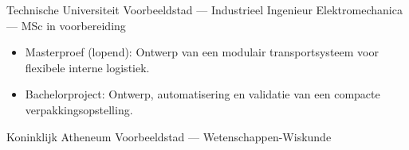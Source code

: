 
\begin{opleiding}
    {Technische Universiteit Voorbeeldstad --- Industrieel Ingenieur Elektromechanica --- MSc in voorbereiding
        \begin{itemize}
            \item Masterproef (lopend): Ontwerp van een modulair transportsysteem voor flexibele interne logistiek.
            \item Bachelorproject: Ontwerp, automatisering en validatie van een compacte verpakkingsopstelling.
        \end{itemize}
    }
    {Koninklijk Atheneum Voorbeeldstad --- Wetenschappen-Wiskunde}
\end{opleiding}
